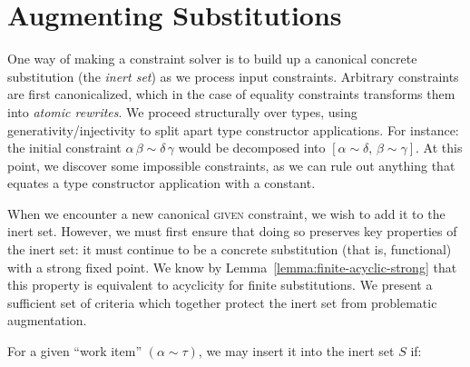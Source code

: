 \documentclass[10pt, letterpaper, oneside]{article}
\begin{document}
\section{Augmenting Substitutions}

One way of making a constraint solver is to build up a canonical concrete substitution (the \emph{inert set}) as we process input constraints. Arbitrary constraints are first canonicalized, which in the case of equality constraints transforms them into \emph{atomic rewrites}. We proceed structurally over types, using generativity/injectivity to split apart type constructor applications. For instance: the initial constraint \(\alpha\, \beta \sim \delta\, \gamma\) would be decomposed into \([\alpha \sim \delta,\, \beta \sim \gamma]\). At this point, we discover some impossible constraints, as we can rule out anything that equates a type constructor application with a constant.

When we encounter a new canonical \textsc{given} constraint, we wish to add it to the inert set. However, we must first ensure that doing so preserves key properties of the inert set: it must continue to be a concrete substitution (that is, functional) with a strong fixed point. We know by Lemma~\ref{lemma:finite-acyclic-strong} that this property is equivalent to acyclicity for finite substitutions. We present a sufficient set of criteria which together protect the inert set from problematic augmentation.






For a given ``work item'' \((\alpha \sim \tau)\), we may insert it into the inert set \(S\) if:
\end{document}
